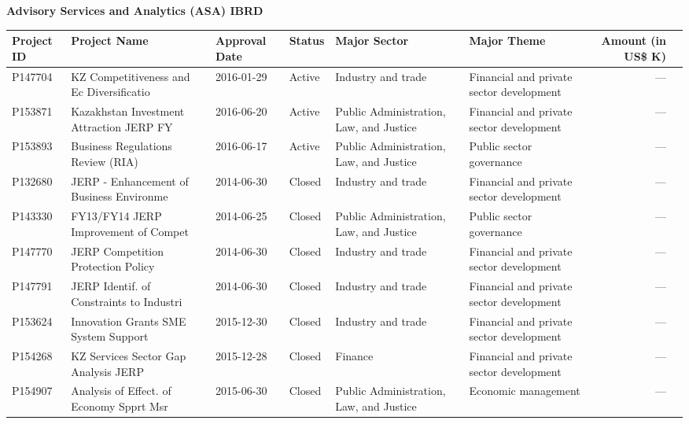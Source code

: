 \documentclass{article}\usepackage[]{graphicx}\usepackage[]{color}
\begin{document}
\begin{minipage}[b]{0.99\textwidth}
\begin{minipage}[b]{0.99\textwidth}
\begin{minipage}[c]{0.99\textwidth}
     \vspace*{0.5cm}
     \end{minipage}
     
     \begin{minipage}[c]{0.99\textwidth} %
     \raggedright{\color{white!30!blue} \textbf{\large Advisory Services and Analytics (ASA) IBRD}}
     \vspace*{0.5cm}
     
{\footnotesize
\begin{tabular}{l>{\raggedright}p{1in}ll>{\raggedright}p{1in}>{\raggedright}p{1in}rl}
 Project ID & Project Name & Approval Date & Status & Major Sector & Major Theme & Amount (in US\$ K) &  \\ 
  \hline
P147704 & KZ Competitiveness and Ec Diversificatio & 2016-01-29 & Active & Industry and trade & Financial and private sector development & --- &  \\ 
  P153871 & Kazakhstan Investment Attraction JERP FY & 2016-06-20 & Active & Public Administration, Law, and Justice & Financial and private sector development & --- &  \\ 
  P153893 & Business Regulations Review (RIA) & 2016-06-17 & Active & Public Administration, Law, and Justice & Public sector governance & --- &  \\ 
  P132680 & JERP - Enhancement of Business Environme & 2014-06-30 & Closed & Industry and trade & Financial and private sector development & --- &  \\ 
  P143330 & FY13/FY14 JERP Improvement of Compet & 2014-06-25 & Closed & Public Administration, Law, and Justice & Public sector governance & --- &  \\ 
  P147770 & JERP Competition Protection Policy & 2014-06-30 & Closed & Industry and trade & Financial and private sector development & --- &  \\ 
  P147791 & JERP Identif. of Constraints to Industri & 2014-06-30 & Closed & Industry and trade & Financial and private sector development & --- &  \\ 
  P153624 & Innovation Grants SME System Support & 2015-12-30 & Closed & Industry and trade & Financial and private sector development & --- &  \\ 
  P154268 & KZ Services Sector Gap Analysis JERP & 2015-12-28 & Closed & Finance & Financial and private sector development & --- &  \\ 
  P154907 & Analysis of Effect. of Economy Spprt Msr & 2015-06-30 & Closed & Public Administration, Law, and Justice & Economic management & --- &  \\ 
  \end{tabular}
}


\end{minipage}
\end{minipage}
\end{minipage}
\end{document}
